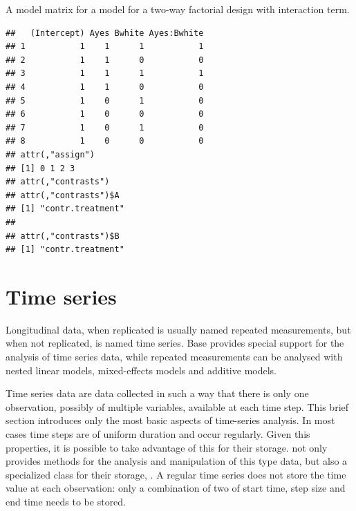 \documentclass[krantz2]{krantz}\usepackage{knitr}%
\begin{document}
\begin{explainbox}
A model matrix for a model for a two-way factorial design with interaction term.
\begin{knitrout}\footnotesize
{}\color{fgcolor}\begin{kframe}
\begin{alltt}
\hlstd{(}\hlopt{~}  \hlopt{*} 
\end{alltt}
\begin{verbatim}
##   (Intercept) Ayes Bwhite Ayes:Bwhite
## 1           1    1      1           1
## 2           1    1      0           0
## 3           1    1      1           1
## 4           1    1      0           0
## 5           1    0      1           0
## 6           1    0      0           0
## 7           1    0      1           0
## 8           1    0      0           0
## attr(,"assign")
## [1] 0 1 2 3
## attr(,"contrasts")
## attr(,"contrasts")$A
## [1] "contr.treatment"
## 
## attr(,"contrasts")$B
## [1] "contr.treatment"
\end{verbatim}
\end{kframe}
\end{knitrout}

\end{explainbox}

\section{Time series}\label{sec:stat:time:series}

Longitudinal data, when replicated is usually named repeated measurements, but when not replicated, is named time series.
Base \Rlang provides special support for the analysis of time series data, while repeated measurements can be analysed with nested linear models, mixed-effects models and additive models.

Time series data are data collected in such a way that there is only one observation, possibly of multiple variables, available at each time step. This brief section introduces only the most basic aspects of time-series analysis. In most cases time steps are of uniform duration and occur regularly. Given this properties, it is possible to take advantage of this for their storage. \Rlang not only provides methods for the analysis and manipulation of this type data, but also a specialized class for their storage, . A regular time series does not store the time value at each observation: only a combination of two of start time, step size and end time needs to be stored.
\end{document}
